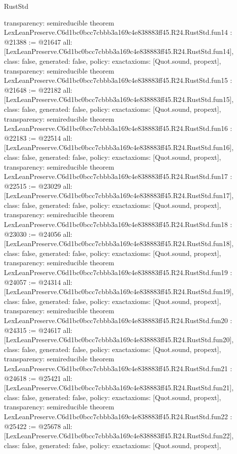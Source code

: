 \begin{lexlean}{RustStd}
\begin{coremodule}
{  transparency: semireducible
}
theorem LexLeanPreserve.C6d1bc0bcc7cbbb3a169c4e838883ff45.R24.RustStd.fun14 : @21388 := @21647 {
  all: [LexLeanPreserve.C6d1bc0bcc7cbbb3a169c4e838883ff45.R24.RustStd.fun14],
  class: false,
  generated: false,
  policy: exact{axioms: [Quot.sound, propext]},
  transparency: semireducible
}
theorem LexLeanPreserve.C6d1bc0bcc7cbbb3a169c4e838883ff45.R24.RustStd.fun15 : @21648 := @22182 {
  all: [LexLeanPreserve.C6d1bc0bcc7cbbb3a169c4e838883ff45.R24.RustStd.fun15],
  class: false,
  generated: false,
  policy: exact{axioms: [Quot.sound, propext]},
  transparency: semireducible
}
theorem LexLeanPreserve.C6d1bc0bcc7cbbb3a169c4e838883ff45.R24.RustStd.fun16 : @22183 := @22514 {
  all: [LexLeanPreserve.C6d1bc0bcc7cbbb3a169c4e838883ff45.R24.RustStd.fun16],
  class: false,
  generated: false,
  policy: exact{axioms: [Quot.sound, propext]},
  transparency: semireducible
}
theorem LexLeanPreserve.C6d1bc0bcc7cbbb3a169c4e838883ff45.R24.RustStd.fun17 : @22515 := @23029 {
  all: [LexLeanPreserve.C6d1bc0bcc7cbbb3a169c4e838883ff45.R24.RustStd.fun17],
  class: false,
  generated: false,
  policy: exact{axioms: [Quot.sound, propext]},
  transparency: semireducible
}
theorem LexLeanPreserve.C6d1bc0bcc7cbbb3a169c4e838883ff45.R24.RustStd.fun18 : @23030 := @24056 {
  all: [LexLeanPreserve.C6d1bc0bcc7cbbb3a169c4e838883ff45.R24.RustStd.fun18],
  class: false,
  generated: false,
  policy: exact{axioms: [Quot.sound, propext]},
  transparency: semireducible
}
theorem LexLeanPreserve.C6d1bc0bcc7cbbb3a169c4e838883ff45.R24.RustStd.fun19 : @24057 := @24314 {
  all: [LexLeanPreserve.C6d1bc0bcc7cbbb3a169c4e838883ff45.R24.RustStd.fun19],
  class: false,
  generated: false,
  policy: exact{axioms: [Quot.sound, propext]},
  transparency: semireducible
}
theorem LexLeanPreserve.C6d1bc0bcc7cbbb3a169c4e838883ff45.R24.RustStd.fun20 : @24315 := @24617 {
  all: [LexLeanPreserve.C6d1bc0bcc7cbbb3a169c4e838883ff45.R24.RustStd.fun20],
  class: false,
  generated: false,
  policy: exact{axioms: [Quot.sound, propext]},
  transparency: semireducible
}
theorem LexLeanPreserve.C6d1bc0bcc7cbbb3a169c4e838883ff45.R24.RustStd.fun21 : @24618 := @25421 {
  all: [LexLeanPreserve.C6d1bc0bcc7cbbb3a169c4e838883ff45.R24.RustStd.fun21],
  class: false,
  generated: false,
  policy: exact{axioms: [Quot.sound, propext]},
  transparency: semireducible
}
theorem LexLeanPreserve.C6d1bc0bcc7cbbb3a169c4e838883ff45.R24.RustStd.fun22 : @25422 := @25678 {
  all: [LexLeanPreserve.C6d1bc0bcc7cbbb3a169c4e838883ff45.R24.RustStd.fun22],
  class: false,
  generated: false,
  policy: exact{axioms: [Quot.sound, propext]},
}
\end{coremodule}
\end{lexlean}
